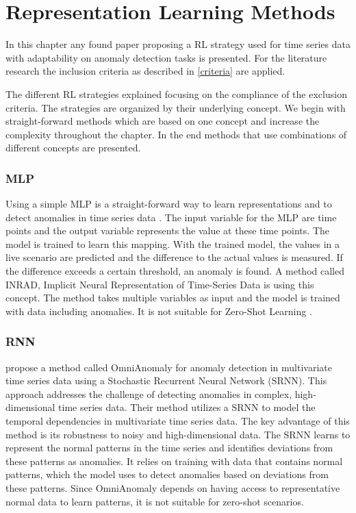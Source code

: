 \section{Representation Learning Methods}\label{review}
In this chapter any found paper proposing a RL strategy used for time series data with adaptability on anomaly detection tasks is presented. For the literature research the inclusion criteria as described in \ref{criteria} are applied.

The different RL strategies explained focusing on the compliance of the exclusion criteria. The strategies are organized by their underlying concept. We begin with straight-forward methods which are based on one concept and increase the complexity throughout the chapter. In the end methods that use combinations of different concepts are presented.
\subsubsection{MLP}
Using a simple MLP is a straight-forward way to learn representations and to detect anomalies in time series data \cite{nielsen_neural_2015}. The input variable for the MLP are time points and the output variable represents the value at these time points. The model is trained to learn this mapping. With the trained model, the values in a live scenario are predicted and the difference to the actual values is measured. If the difference exceeds a certain threshold, an anomaly is found. A method called INRAD, Implicit Neural Representation of Time-Series Data is using this concept. The method takes multiple variables as input and the model is trained with data including anomalies. It is not suitable for Zero-Shot Learning \cite{jeong_time-series_2022}.
\subsubsection{RNN}
\cite{su_robust_2019} propose a method called OmniAnomaly for anomaly detection in multivariate time series data using a Stochastic Recurrent Neural Network (SRNN). This approach addresses the challenge of detecting anomalies in complex, high-dimensional time series data.
Their method utilizes a SRNN to model the temporal dependencies in multivariate time series data.
The key advantage of this method is its robustness to noisy and high-dimensional data. The SRNN learns to represent the normal patterns in the time series and identifies deviations from these patterns as anomalies. It relies on training with data that contains normal patterns, which the model uses to detect anomalies based on deviations from these patterns. Since OmniAnomaly depends on having access to representative normal data to learn patterns, it is not suitable for zero-shot scenarios.
